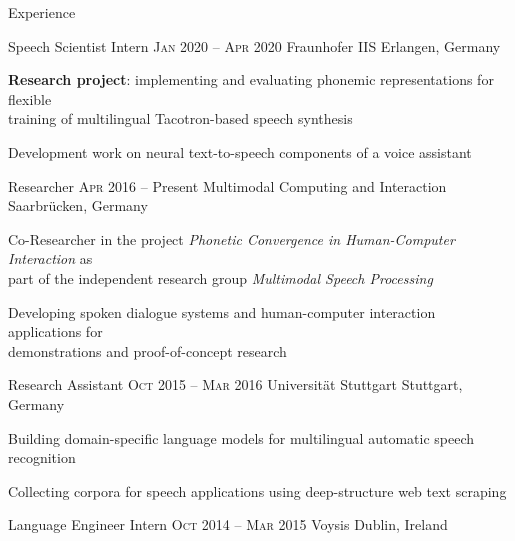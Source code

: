 \documentclass{resume} %
\begin{document}
\begin{rSection}{Experience}

\begin{rSubsection}
	{Speech Scientist Intern}
	{\textsc{Jan} 2020 -- \textsc{Apr} 2020}
	{Fraunhofer IIS}
	{Erlangen, Germany}
	
	\setlength{\itemindent}{.7cm}
	
	\item \textbf{Research project}: implementing and evaluating phonemic representations for flexible\\\hspace*{4.25cm}training of multilingual Tacotron-based speech synthesis
	\item Development work on neural text-to-speech components of a voice assistant
\end{rSubsection}

\begin{rSubsection}
	{Researcher}
	{\textsc{Apr} 2016 -- Present}
	{Multimodal Computing and Interaction}
	{Saarbrücken, Germany}
	
	\setlength{\itemindent}{.7cm}
	
	\item Co-Researcher in the project \textit{Phonetic Convergence in Human-Computer Interaction} as\\\hspace*{.7cm}part of the independent research group \textit{Multimodal Speech Processing}
	\item Developing spoken dialogue systems and human-computer interaction applications for\\\hspace*{.7cm}demonstrations and proof-of-concept research
\end{rSubsection}

\begin{rSubsection}
	{Research Assistant}
	{\textsc{Oct} 2015 -- \textsc{Mar} 2016}
	{Universität Stuttgart}
	{Stuttgart, Germany}
	
	\setlength{\itemindent}{.7cm}
	
	\item Building domain-specific language models for multilingual automatic speech recognition
	\item Collecting corpora for speech applications using deep-structure web text scraping
\end{rSubsection}

\begin{rSubsection}
	{Language Engineer Intern}
	{\textsc{Oct} 2014 -- \textsc{Mar} 2015}
	{Voysis}
	{Dublin, Ireland}
	

\end{rSubsection}
\end{rSection}
\end{document}
